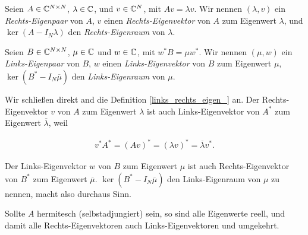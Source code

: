 \begin{definition} \label{links_rechts_eigen_}

    Seien $A \in \mathbb{C}^{N \times N}$, $\lambda \in \mathbb{C}$, und $v \in \mathbb{C}^N$, mit $A v = \lambda v$.
    Wir nennen $(\lambda, v)$ ein \textit{Rechts-Eigenpaar} von $A$, $v$ einen \textit{Rechts-Eigenvektor} von $A$ zum Eigenwert $\lambda$, und $\ker (A - I_N \lambda)$ den \textit{Rechts-Eigenraum} von $\lambda$.

    Seien $B \in \mathbb{C}^{N \times N}$, $\mu \in \mathbb{C}$ und $w \in \mathbb{C}$, mit $w^\ast B = \mu w^\ast$.
    Wir nennen $(\mu, w)$ ein \textit{Links-Eigenpaar} von $B$, $w$ einen \textit{Links-Eigenvektor} von $B$ zum Eigenwert $\mu$, $\ker (B^\ast - I_N \overline \mu)$ den \textit{Links-Eigenraum} von $\mu$.

\end{definition}

\begin{remark}

    Wir schließen direkt and die Definition \ref{links_rechts_eigen_} an.
    Der Rechts-Eigenvektor $v$ von $A$ zum Eigenwert $\lambda$ ist auch Links-Eigenvektor von $A^\ast$ zum Eigenwert $\overline \lambda$, weil

    \begin{align*}
        v^\ast A^\ast
        =
        (A v)^\ast
        =
        (\lambda v)^\ast
        =
        \overline \lambda v^\ast.
    \end{align*}

    Der Links-Eigenvektor $w$ von $B$ zum Eigenwert $\mu$ ist auch Rechts-Eigenvektor von $B^\ast$ zum Eigenwert $\overline \mu$.
    $\ker (B^\ast - I_N \overline \mu)$ den Links-Eigenraum von $\mu$ zu nennen, macht also durchaus Sinn.

    Sollte $A$ hermitesch (selbstadjungiert) sein, so sind alle Eigenwerte reell, und damit alle Rechts-Eigenvektoren auch Links-Eigenvektoren und umgekehrt.

\end{remark}

\begin{comment}



    $A^\ast$ ist tatsächlich die Adjungierte von $A$ im Sinne der Funktionalanalysis, weil $\Forall x, y \in \C^N:$

    \begin{align*}
        (A x, y)_2
        =
        y^\ast A x
        =
        (A^\ast y)^\ast x
        =
        (x, A^\ast y)_2.
    \end{align*}

    Nun ist $\overline \lambda$ Eigenwert von $A^\ast$ mit derselben algebraischen Vielfachheit wie $\lambda$, weil

    \begin{align*}
        \chi_{A^\ast}(\lambda)
        =
        \det(A^\ast - I_N \lambda)
        =
        \overline{\det(A - I_N \lambda)^\top}
        =
        \overline{\chi_A(\lambda)}.
    \end{align*}

\end{comment}
